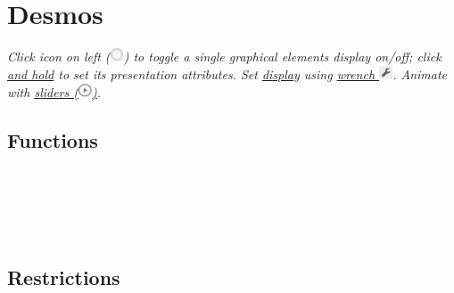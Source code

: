 \section{Desmos}
\textit{Click icon on left (\includegraphics[width=4mm,height=4mm,align=c,keepaspectratio]{img/circle.png}{}) to toggle a single graphical element\textquotesingle s display on/off; click \ul{and hold} to set its presentation attributes. Set \href{https://www.desmos.com/calculator/bs0bpg9zox}{display} using \href{https://www.desmos.com/calculator/bs0bpg9zox}{wrench \includegraphics[width=4mm,height=4mm,align=c,keepaspectratio]{img/wrench.png}{}}. Animate with \href{https://www.desmos.com/calculator/tqjf823xvg}{sliders (\includegraphics[width=4mm,height=4mm,align=c,keepaspectratio]{img/slider.png}{})}.}\\


\subsection*{Functions}
 \\
 \\
 \\
 \\


\subsection*{Restrictions}
 \\
 \\ 
 \\


